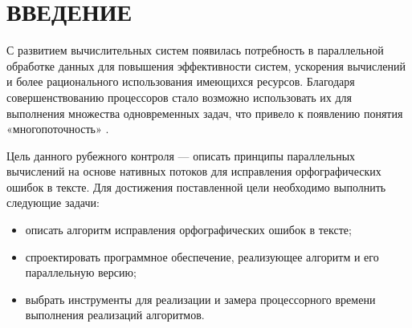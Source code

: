 \chapter*{ВВЕДЕНИЕ}

С развитием вычислительных систем появилась потребность в параллельной обработке данных для повышения эффективности систем, ускорения вычислений и более рационального использования имеющихся ресурсов. 
Благодаря совершенствованию процессоров стало возможно использовать их для выполнения множества одновременных задач, что привело к появлению понятия «многопоточность» \cite{intro}.

Цель данного рубежного контроля --- описать принципы параллельных вычислений на основе нативных потоков для исправления орфографических ошибок в тексте. Для достижения поставленной цели необходимо выполнить следующие задачи:
\begin{itemize}
	\item описать алгоритм исправления орфографических ошибок в тексте;
	\item спроектировать программное обеспечение, реализующее алгоритм и его параллельную версию;
	\item выбрать инструменты для реализации и замера процессорного времени
	выполнения реализаций алгоритмов.
\end{itemize}
